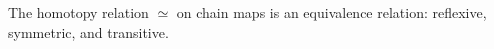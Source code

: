 The homotopy relation $\simeq$ on chain maps is an equivalence relation: reflexive, symmetric, and transitive.